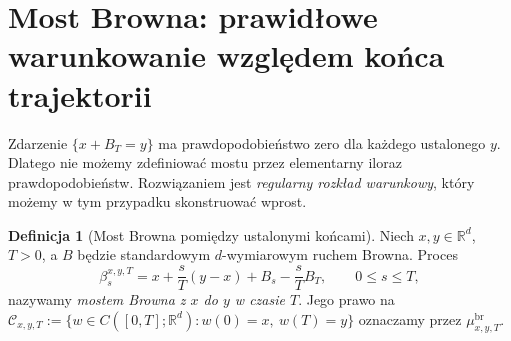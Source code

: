 \documentclass[11pt,a4paper,oneside]{report}
\numberwithin{equation}{chapter}
\theoremstyle{plain}
\theoremstyle{definition}
\newtheorem{definicja}{Definicja}[chapter]
\theoremstyle{remark}
\newcommand{\R}{\mathbb{R}}
\newcommand{\calC}{\mathcal{C}}
\begin{document}
\section{Most Browna: prawidłowe warunkowanie względem końca trajektorii}

Zdarzenie $\{x+B_T=y\}$ ma prawdopodobieństwo zero dla
każdego ustalonego $y$. Dlatego nie możemy zdefiniować mostu
przez elementarny iloraz prawdopodobieństw.
Rozwiązaniem jest \emph{regularny rozkład warunkowy}, który
możemy w tym przypadku skonstruować wprost.

\begin{definicja}[Most Browna pomiędzy ustalonymi końcami]
\label{def:brownian-bridge-path}
Niech $x,y\in\R^d$, $T>0$, a $B$ będzie standardowym
$d$-wymiarowym ruchem Browna. Proces
\[
 \beta_s^{x,y,T}=x+\frac{s}{T}(y-x)+B_s-\frac{s}{T}B_T,
 \qquad 0\le s\le T,
\]
nazywamy \emph{mostem Browna z $x$ do $y$ w czasie $T$}.
Jego prawo na
$\calC_{x,y,T}:=\{w\in C([0,T];\R^d):w(0)=x,\ w(T)=y\}$
oznaczamy przez $\mu_{x,y,T}^{\mathrm{br}}$.
\end{definicja}
\end{document}
